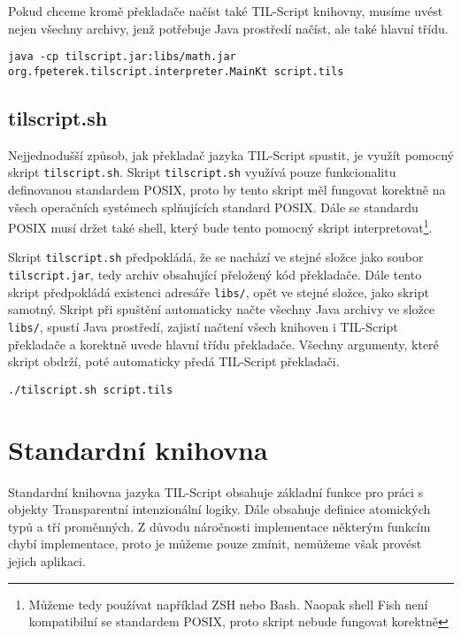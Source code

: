 Pokud chceme kromě překladače načíst také TIL-Script knihovny, musíme uvést nejen všechny archivy,
jenž potřebuje Java prostředí načíst, ale také hlavní třídu.

\begin{lstlisting}[caption={Spuštění překladače s načtením knihoven}]
java -cp tilscript.jar:libs/math.jar org.fpeterek.tilscript.interpreter.MainKt script.tils
\end{lstlisting}

\subsection{tilscript.sh}

Nejjednodušší způsob, jak překladač jazyka TIL-Script spustit, je využít pomocný skript
\lstinline{tilscript.sh}. Skript \lstinline{tilscript.sh} využívá pouze funkcionalitu definovanou
standardem POSIX, proto by tento skript měl fungovat korektně na všech operačních systémech
splňujících standard POSIX. Dále se standardu POSIX musí držet také shell, který bude tento pomocný
skript interpretovat\footnote{Můžeme tedy používat například ZSH nebo Bash. Naopak shell Fish není
kompatibilní se standardem POSIX, proto skript nebude fungovat korektně}.

Skript \lstinline{tilscript.sh} předpokládá, že se nachází ve stejné složce jako soubor
\lstinline{tilscript.jar}, tedy archiv obsahující přeložený kód překladače. Dále tento skript
předpokládá existenci adresáře \lstinline{libs/}, opět ve stejné složce, jako skript samotný.
Skript při spuštění automaticky načte všechny Java archivy ve složce \lstinline{libs/}, spustí
Java prostředí, zajistí načtení všech knihoven i TIL-Script překladače a korektně uvede hlavní
třídu překladače. Všechny argumenty, které skript obdrží, poté automaticky předá TIL-Script
překladači.

\begin{lstlisting}[caption={Spuštění překladače za využití pomocného skriptu}]
./tilscript.sh script.tils
\end{lstlisting}

\section{Standardní knihovna}

Standardní knihovna jazyka TIL-Script obsahuje základní funkce pro práci s objekty Transparentní
intenzionální logiky. Dále obsahuje definice atomických typů a tří proměnných. Z důvodu náročnosti
implementace některým funkcím chybí implementace, proto je můžeme pouze zmínit, nemůžeme však
provést jejich aplikaci.

